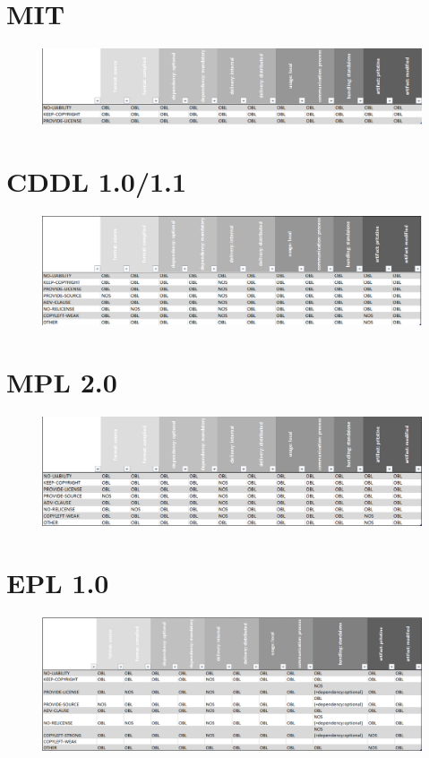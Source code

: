 \documentclass[12pt,titlepage]{report}
\begin{document}
\newpage
\section*{MIT}
\begin{figure}[h]
    \centering
    \includegraphics[scale=0.5]{Bilder/MIT.png}
\end{figure}

\section*{CDDL 1.0/1.1}
\begin{figure}[h]
    \centering
    \includegraphics[scale=0.5]{Bilder/CDDL.png}
\end{figure}

\section*{MPL 2.0}
\begin{figure}[h]
    \centering
    \includegraphics[scale=0.5]{Bilder/MPL 2.0.png}
\end{figure}

\newpage
\section*{EPL 1.0}
\begin{figure}[h]
    \centering
    \includegraphics[scale=0.5]{Bilder/EPL10.png}
\end{figure}
\end{document}
